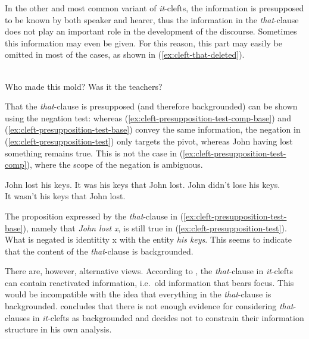 In the other and most common variant of \emph{it}-clefts, the information is presupposed to be known by both speaker and hearer, thus the information in the \emph{that}-clause does not play an important role in the development of the discourse. Sometimes this information may even be given. For this reason, this part may easily be omitted in most of the cases, as shown in (\ref{ex:cleft-that-deleted}).

\ea \citep[897]{Prince.1978}\\
Who made this mold? Was it the teachers? 
\label{ex:cleft-that-deleted}
\z 


That the \emph{that}-clause is presupposed (and therefore backgrounded) can be shown using the negation test: whereas (\ref{ex:cleft-presupposition-test-comp-base}) and (\ref{ex:cleft-presupposition-test-base}) convey the same information, the negation in (\ref{ex:cleft-presupposition-test}) only targets the pivot, whereas John having lost something remains true. This is not the case in (\ref{ex:cleft-presupposition-test-comp}), where the scope of the negation is ambiguous.

\eal 
\ex John lost his keys.
\label{ex:cleft-presupposition-test-comp-base}
\ex It was his keys that John lost.
\label{ex:cleft-presupposition-test-base}
\ex John didn't lose his keys.
\label{ex:cleft-presupposition-test-comp}
\ex \citep[884]{Prince.1978}\\
It wasn't his keys that John lost. 
\label{ex:cleft-presupposition-test}
\zl 

The proposition expressed by the \textit{that}-clause in (\ref{ex:cleft-presupposition-test-base}), namely that \textit{John lost x}, is still true in (\ref{ex:cleft-presupposition-test}). What is negated is identitity x with the entity \textit{his keys}. This seems to indicate that the content of the \textit{that}-clause is backgrounded.

There are, however, alternative views. According to \citet[96]{Gussenhoven.2007}, the \emph{that}-clause in \emph{it}-clefts can contain reactivated information, i.e.\ old information that bears focus. This would be incompatible with the idea that everything in the \textit{that}-clause is backgrounded.  \citet{Song.2017} concludes that there is not enough evidence for considering \emph{that}-clauses in \emph{it}-clefts as backgrounded and decides not to constrain their information structure in his own analysis.

